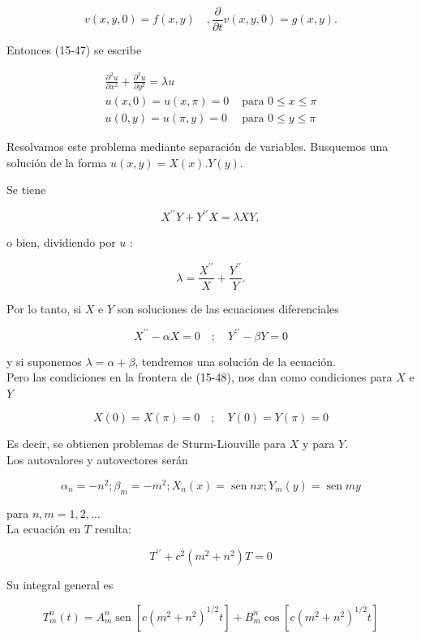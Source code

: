 \documentclass[10pt]{article}
\theoremstyle{plain}
\theoremstyle{definition}
\theoremstyle{remark}
\begin{document}
$$
v(x, y, 0)=f(x, y) \quad, \frac{\partial}{\partial t} v(x, y, 0)=g(x, y) .
$$

Entonces (15-47) se escribe

\[
\begin{array}{ll}
\frac{\partial^{2} u}{\partial x^{2}}+\frac{\partial^{2} u}{\partial y^{2}}=\lambda u & \\
u(x, 0)=u(x, \pi)=0 & \text { para } 0 \leqslant x \leqslant \pi \\
u(0, y)=u(\pi, y)=0 & \text { para } 0 \leqslant y \leqslant \pi \tag{15-48}
\end{array}
\]

Resolvamos este problema mediante separación de variables. Busquemos una solución de la forma $u(x, y)=X(x) . Y(y)$.

Se tiene

$$
X^{\prime \prime} Y+Y^{\prime \prime} X=\lambda X Y,
$$

o bien, dividiendo por $u$ :

$$
\lambda=\frac{X^{\prime \prime}}{X}+\frac{Y^{\prime \prime}}{Y} .
$$

Por lo tanto, si $X$ e $Y$ son soluciones de las ecuaciones diferenciales

$$
X^{\prime \prime}-\alpha X=0 \quad ; \quad Y^{\prime \prime}-\beta Y=0
$$

y si suponemos $\lambda=\alpha+\beta$, tendremos una solución de la ecuación.\\
Pero las condiciones en la frontera de (15-48), nos dan como condiciones para $X$ e $Y$

$$
X(0)=X(\pi)=0 \quad ; \quad Y(0)=Y(\pi)=0
$$

Es decir, se obtienen problemas de Sturm-Liouville para $X$ y para $Y$.\\
Los autovalores y autovectores serán

$$
\alpha_{n}=-n^{2} ; \beta_{m}=-m^{2} ; X_{n}(x)=\operatorname{sen} n x ; Y_{m}(y)=\operatorname{sen} m y
$$

para $n, m=1,2, \ldots$\\
La ecuación en $T$ resulta:


\begin{equation*}
T^{\prime \prime}+c^{2}\left(m^{2}+n^{2}\right) T=0 \tag{15-49}
\end{equation*}


Su integral general es

$$
T_{m}^{n}(t)=A_{m}^{n} \operatorname{sen}\left[c\left(m^{2}+n^{2}\right)^{1 / 2} t\right]+B_{m}^{n} \cos \left[c\left(m^{2}+n^{2}\right)^{1 / 2} t\right]
$$
\end{document}
